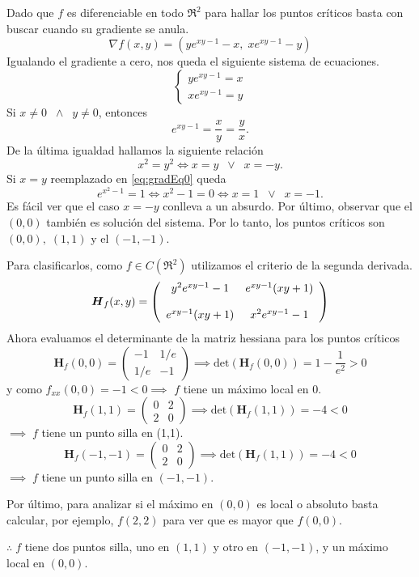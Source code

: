 \begin{solution}
    Dado que $f$ es diferenciable en todo $\Re^{2}$    para hallar los puntos cr\'iticos  basta con buscar cuando su  gradiente se anula.
    \[
        \nabla f(x,y)= \left( ye^{xy-1}-x,\; xe^{xy-1}-y \right)
    \]
    Igualando el gradiente a cero, nos queda el siguiente sistema de ecuaciones.
    \[
        \begin{cases}
            ye^{xy-1}=x \\
            xe^{xy-1}=y
        \end{cases}
    \]
    Si $x\neq0 \;\;\land\;\; y\neq0$, entonces
    \begin{equation}
        e^{xy-1}=\frac{x}{y}=\frac{y}{x}. \label{eq:gradEq0}
    \end{equation}
    De la última igualdad hallamos la siguiente relación  $$  x^2=y^2 \iff x=y \;\;\lor\;\; x=-y.$$
    Si  $x=y$ reemplazado en  \eqref{eq:gradEq0} queda
    $$  e^{x^2-1}=1  \iff  x^2-1=0 \iff x=1 \;\;\lor\;\; x=-1.$$
    Es f\'acil ver que el caso  $x=-y$  conlleva a un absurdo.   Por \'ultimo, observar que  el $(0,0)$  también es solución del sistema.  Por lo tanto, los puntos críticos son $(0,0),\;(1,1)$ y el $(-1,-1)$.

    Para clasificarlos,  como $f \in C(\Re^{2})$ utilizamos el criterio de la segunda derivada.
    \[
        \setlength{\abovedisplayskip}{0.5cm}
        \setlength{\belowdisplayskip}{0.5cm}
        \boldsymbol{H}_f(x,y) = \left(\begin{array}{cc}
                y^2e^{xy-1}-1  & e^{xy-1}(xy+1) \\[.4cm]
                e^{xy-1}(xy+1) & x^2e^{xy-1}-1
            \end{array}\right)
    \]
    Ahora evaluamos el determinante de la matriz hessiana para los puntos críticos
    \[
        \boldsymbol{H}_f(0,0) = \left(\begin{array}{cc}
                -1  & 1/e \\
                1/e & -1
            \end{array}\right)
        \implies \text{det} \left( \boldsymbol{H}_f(0,0) \right)  = 1 - \frac{1}{e^2} > 0
    \]
    y como $f_{xx}(0,0)=-1<0 \implies$ $f$ tiene un máximo local en 0.
    \[
        \boldsymbol{H}_f(1,1) = \left(\begin{array}{cc}
                0 & 2 \\
                2 & 0
            \end{array}\right)
        \implies \text{det} \left( \boldsymbol{H}_f(1,1) \right)  = -4 < 0
    \]
    $\implies \;f$ tiene un punto silla en (1,1).
    \[
        \boldsymbol{H}_f(-1,-1) = \left(\begin{array}{cc}
                0 & 2 \\
                2 & 0
            \end{array}\right)
        \implies \text{det} \left( \boldsymbol{H}_f(1,1) \right)  = -4 < 0
    \]
    $\implies \;f$ tiene un punto silla en $(-1,-1)$.

    Por último, para analizar si el máximo en $(0,0)$ es local o absoluto basta calcular, por ejemplo, $f(2,2)$ para ver que es mayor que $f(0,0)$.

    $\therefore\;f$ tiene dos puntos silla, uno en $(1,1)$ y otro en $(-1,-1)$, y un máximo local en $(0,0)$.

\end{solution}

